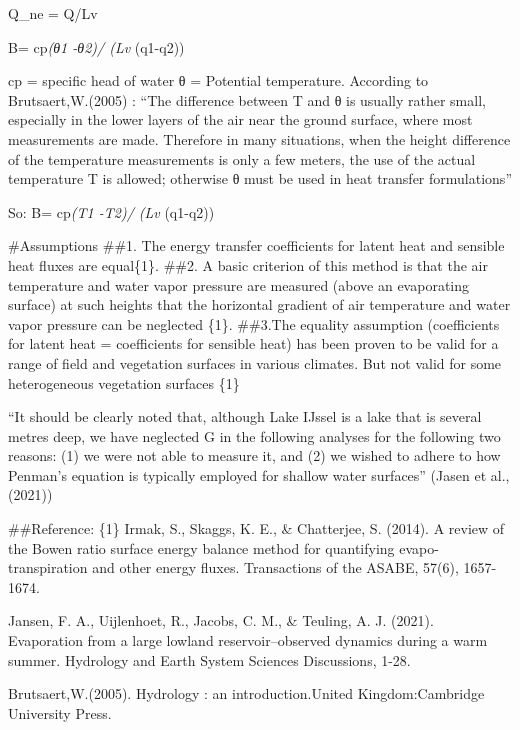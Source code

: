 \documentclass[
]{article}
\begin{document}
Q\_ne = Q/Lv

B= cp\emph{(θ1 -θ2)/ (Lv } (q1-q2))

cp = specific head of water θ = Potential temperature. According to
Brutsaert,W.(2005) : ``The difference between T and θ is usually rather
small, especially in the lower layers of the air near the ground
surface, where most measurements are made. Therefore in many situations,
when the height difference of the temperature measurements is only a few
meters, the use of the actual temperature T is allowed; otherwise θ must
be used in heat transfer formulations''

So: B= cp\emph{(T1 -T2)/ (Lv } (q1-q2))

\#Assumptions \#\#1. The energy transfer coefficients for latent heat
and sensible heat fluxes are equal\{1\}. \#\#2. A basic criterion of
this method is that the air temperature and water vapor pressure are
measured (above an evaporating surface) at such heights that the
horizontal gradient of air temperature and water vapor pressure can be
neglected \{1\}. \#\#3.The equality assumption (coefficients for latent
heat = coefficients for sensible heat) has been proven to be valid for a
range of field and vegetation surfaces in various climates. But not
valid for some heterogeneous vegetation surfaces \{1\}

``It should be clearly noted that, although Lake IJssel is a lake that
is several metres deep, we have neglected G in the following analyses
for the following two reasons: (1) we were not able to measure it, and
(2) we wished to adhere to how Penman's equation is typically employed
for shallow water surfaces'' (Jasen et al., (2021))

\#\#Reference: \{1\} Irmak, S., Skaggs, K. E., \& Chatterjee, S. (2014).
A review of the Bowen ratio surface energy balance method for
quantifying evapo-transpiration and other energy fluxes. Transactions of
the ASABE, 57(6), 1657-1674.

Jansen, F. A., Uijlenhoet, R., Jacobs, C. M., \& Teuling, A. J. (2021).
Evaporation from a large lowland reservoir--observed dynamics during a
warm summer. Hydrology and Earth System Sciences Discussions, 1-28.

Brutsaert,W.(2005). Hydrology : an introduction.United Kingdom:Cambridge
University Press.
\end{document}
